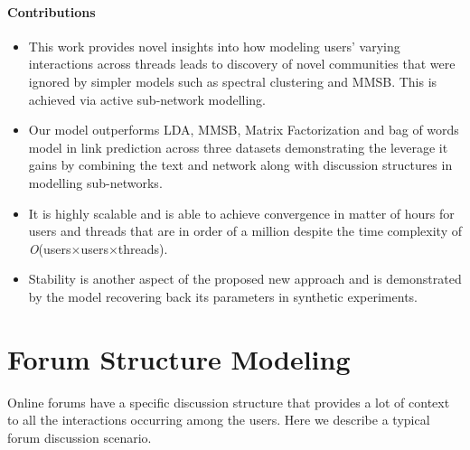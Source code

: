 \documentclass{sig-alternate}
\newcommand{\order}[1]{\textit{O}(#1)}
\begin{document}
\vspace*{-0.5\baselineskip}
\paragraph{Contributions}
\vspace*{-0.5\baselineskip}
\begin{itemize}
  \item This work provides novel insights
into how modeling users' varying interactions across threads leads to 
discovery of novel communities that were ignored by simpler models such as
spectral clustering and MMSB. This is achieved via active sub-network
modelling.
\item Our model outperforms LDA, MMSB, Matrix Factorization and
bag of words model in link prediction across three
datasets demonstrating the leverage it gains by 
combining the text and network along with discussion
structures in modelling sub-networks.
\item It is highly scalable and is able to achieve convergence in
matter of hours for users and threads that are in order of a million despite the
time complexity of \order{users$\times$users$\times$threads}.
\item  Stability
is another aspect of the proposed new approach and is demonstrated by
the model recovering back its parameters in synthetic experiments. 
\end{itemize} 




\section{Forum Structure Modeling}
\label{sec:approach}
Online forums have a specific discussion structure  that
provides a lot of context to all the interactions occurring among the users.
Here we describe a typical forum discussion scenario.
\end{document}
